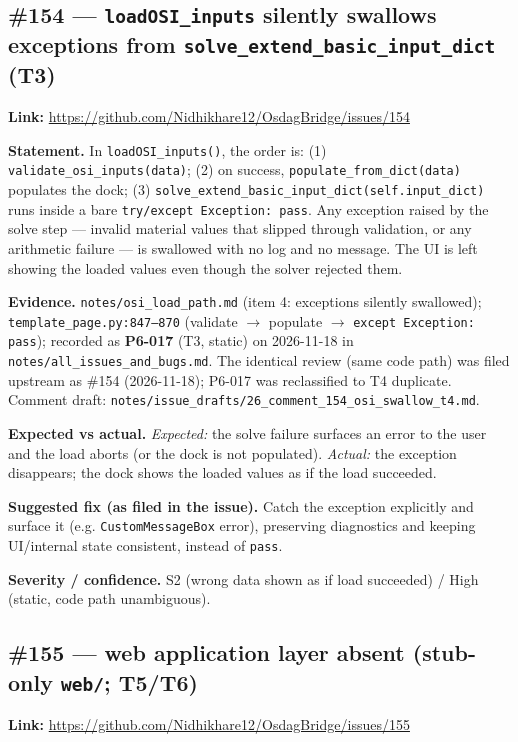 \subsection{\#154 --- \texttt{loadOSI\_inputs} silently swallows exceptions from \texttt{solve\_extend\_basic\_input\_dict} (T3)}
\textbf{Link:} \url{https://github.com/Nidhikhare12/OsdagBridge/issues/154}

\textbf{Statement.} In \texttt{loadOSI\_inputs()}, the order is: (1) \texttt{validate\_osi\_inputs(data)}; (2) on success, \texttt{populate\_from\_dict(data)} populates the dock; (3) \texttt{solve\_extend\_basic\_input\_dict(self.input\_dict)} runs inside a bare \texttt{try/except Exception: pass}. Any exception raised by the solve step --- invalid material values that slipped through validation, or any arithmetic failure --- is swallowed with no log and no message. The UI is left showing the loaded values even though the solver rejected them.

\textbf{Evidence.} \texttt{notes/osi\_load\_path.md} (item 4: exceptions silently swallowed); \texttt{template\_page.py:847--870} (validate $\rightarrow$ populate $\rightarrow$ \texttt{except Exception: pass}); recorded as \textbf{P6-017} (T3, static) on 2026-11-18 in \texttt{notes/all\_issues\_and\_bugs.md}. The identical review (same code path) was filed upstream as \#154 (2026-11-18); P6-017 was reclassified to T4 duplicate. Comment draft: \texttt{notes/issue\_drafts/26\_comment\_154\_osi\_swallow\_t4.md}.

\textbf{Expected vs actual.} \emph{Expected:} the solve failure surfaces an error to the user and the load aborts (or the dock is not populated). \emph{Actual:} the exception disappears; the dock shows the loaded values as if the load succeeded.

\textbf{Suggested fix (as filed in the issue).} Catch the exception explicitly and surface it (e.g. \texttt{CustomMessageBox} error), preserving diagnostics and keeping UI/internal state consistent, instead of \texttt{pass}.

\textbf{Severity / confidence.} S2 (wrong data shown as if load succeeded) / High (static, code path unambiguous).

\subsection{\#155 --- web application layer absent (stub-only \texttt{web/}; T5/T6)}
\textbf{Link:} \url{https://github.com/Nidhikhare12/OsdagBridge/issues/155}

